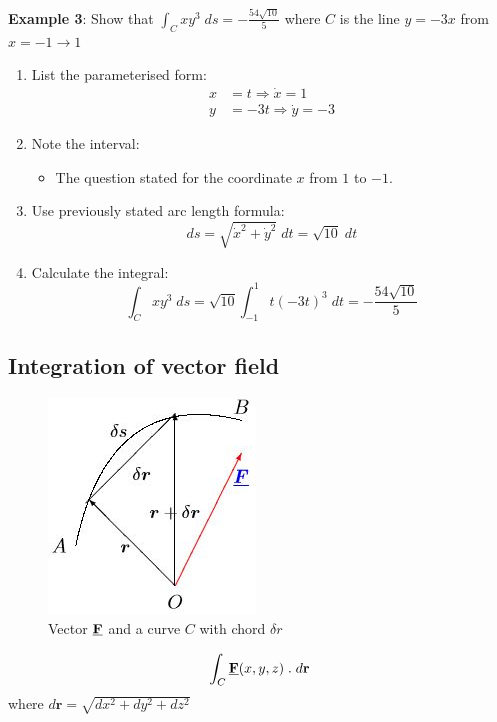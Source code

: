 \documentclass[10pt,a4paper]{article}
\begin{document}
\textbf{Example 3}: Show that $\int_C xy^3 \; ds = -\frac{54\sqrt{10}}{5}$ where $C$ is the line
$y=-3x$ from $x=-1 \rightarrow 1$
\begin{enumerate}
    \item List the parameterised form:
    \begin{align*}
        x &= t \Rightarrow \dot{x} = 1 \\
        y &= -3t \Rightarrow \dot{y} = -3
    \end{align*}
    \item Note the interval: 
    \begin{itemize}
        \item The question stated for the coordinate $x$ from $1$ to $-1$.
    \end{itemize}
    \item Use previously stated arc length formula:
    $$
        ds = \sqrt{\dot{x}^2 + \dot{y}^2} \; dt = \sqrt{10} \; dt
    $$
    \item Calculate the integral:
    $$
        \int_C xy^3 \; ds = \sqrt{10}\int_{-1}^1 t(-3t)^3 \; dt = -\frac{54\sqrt{10}}{5}
    $$
\end{enumerate}

\subsection{Integration of vector field}

\begin{figure} [h!]
    \centering
    \includegraphics[scale=0.7]{Type2.JPG}
    \caption{Vector $\textbf{\underline{F}}$ and a curve $C$ with chord $\delta r$}
\end{figure}
\begin{tcolorbox}[breakable,colback=white]
    $$
    \int_C \textbf{\underline{F}}(x,y,z)\; . \; d \textbf{r}
    $$
    where $d\textbf{r} = \sqrt{dx^2+dy^2+dz^2}$
\end{tcolorbox}
\end{document}
